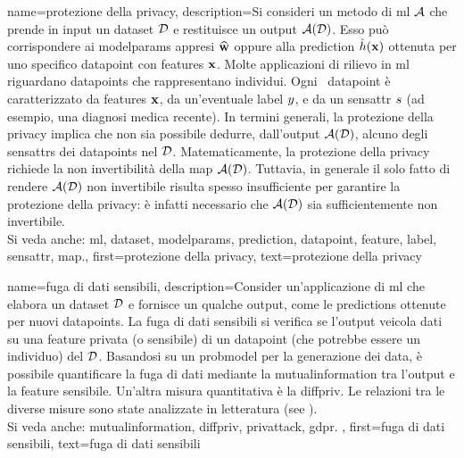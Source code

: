 {name={protezione della privacy},
     description={Si consideri un metodo di \gls{ml} $\mathcal{A}$ che prende in 
     input un \gls{dataset} $\mathcal{D}$ e restituisce un output $\mathcal{A}(\mathcal{D})$. Esso può corrispondere ai 
	 	\glspl{modelparam} appresi $\widehat{{\bf w}}$ oppure alla \gls{prediction} 
	 	$\hat{h}({\bf x})$ ottenuta per uno specifico \gls{datapoint} con \glspl{feature} 
	 	${\bf x}$. Molte applicazioni di rilievo in \gls{ml} riguardano \glspl{datapoint} 
		che rappresentano individui. Ogni \ \gls{datapoint} è caratterizzato da \glspl{feature} ${\bf x}$, 
		da un’eventuale \gls{label} $y$, e da un \gls{sensattr} $s$ (ad esempio, una diagnosi 
		medica recente). 
		In termini generali, la protezione della privacy implica che non sia possibile dedurre, dall’output 
		$\mathcal{A}(\mathcal{D})$, 
		alcuno degli \glspl{sensattr} dei \glspl{datapoint} nel $\mathcal{D}$. Matematicamente, la protezione 
		della privacy richiede la non invertibilità della \gls{map} $\mathcal{A}(\mathcal{D})$. Tuttavia, in generale il 
		solo fatto di rendere $\mathcal{A}(\mathcal{D})$ non invertibile risulta spesso insufficiente per garantire la 
		protezione della privacy: è infatti necessario che $\mathcal{A}(\mathcal{D})$ sia sufficientemente non 
		invertibile. 
					\\ 
		Si veda anche: \gls{ml}, \gls{dataset}, \glspl{modelparam}, \gls{prediction}, \gls{datapoint}, \gls{feature}, \gls{label}, \gls{sensattr}, \gls{map}.}, 
	first={protezione della privacy}, 
	text={protezione della privacy} 
}


{name={fuga di dati sensibili},
	description={Consider un’applicazione di \gls{ml} che elabora un 
		\gls{dataset} $\mathcal{D}$ e fornisce un qualche output, come le \glspl{prediction} 
		ottenute per nuovi \glspl{datapoint}. La fuga di dati sensibili si verifica se l’output 
		veicola dati su una \gls{feature} privata (o sensibile) di un \gls{datapoint} 
		(che potrebbe essere un individuo) del $\mathcal{D}$. Basandosi su un \gls{probmodel} 
		per la generazione dei \gls{data}, è possibile quantificare la fuga di dati mediante la 
		\gls{mutualinformation} 
		tra l’output e la \gls{feature} sensibile. Un’altra misura quantitativa è la \gls{diffpriv}. Le relazioni tra le 
		diverse misure sono state analizzate in letteratura (see \cite{InfThDiffPriv}). 
				\\ 
		Si veda anche: \gls{mutualinformation}, \gls{diffpriv}, \gls{privattack}, \gls{gdpr}. }, 
	first={fuga di dati sensibili}, 
	text={fuga di dati sensibili} 
}




